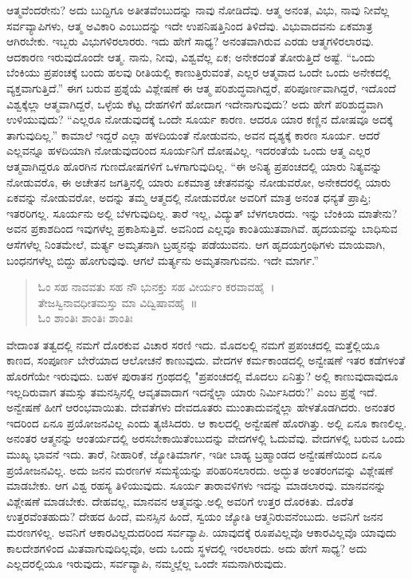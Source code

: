 ಆತ್ಮವೆಂದರೇನು? ಅದು ಬುದ್ದಿಗೂ ಅತೀತವೆಂಬುದನ್ನು ನಾವು ನೋಡಿದೆವು. ಆತ್ಮ ಅನಂತ, ವಿಭು, ನಾವು ನೀವೆಲ್ಲ ಸರ್ವವ್ಯಾಪಿಗಳು, ಆತ್ಮ ಅವಿಕಾರಿ ಎಂಬುದನ್ನು ಇದೇ ಉಪನಿಷತ್ತಿನಿಂದ ತಿಳಿದೆವು. ವಿಭುವಾದವನು ಏಕಮಾತ್ರ ಆಗಿರಬೇಕು. ಇಬ್ಬರು ವಿಭುಗಳಿರಲಾರರು. ಇದು ಹೇಗೆ ಸಾಧ್ಯ? ಅನಂತವಾಗಿರುವ ಎರಡು ಆತ್ಮಗಳಿರಲಾರವು. ಆದಕಾರಣ ಇರುವುದೊಂದೇ ಆತ್ಮ. ನಾನು, ನೀವು, ವಿಶ್ವವೆಲ್ಲ ಏಕ; ಅನೇಕದಂತೆ ತೋರುತ್ತಿದೆ ಅಷ್ಟೆ. “ಒಂದು ಬೆಂಕಿಯು ಪ್ರಪಂಚಕ್ಕೆ ಬಂದು ಹಲವು ರೀತಿಯಲ್ಲಿ ಕಾಣುತ್ತಿರುವಂತೆ, ಎಲ್ಲರ ಆತ್ಮವಾದ ಒಂದೇ ಒಂದು ಅನೇಕದಲ್ಲಿ ವ್ಯಕ್ತವಾಗುತ್ತಿದೆ.” ಈಗ ಬರುವ ಪ್ರಶ್ನೆಯೆ ವಿಶ್ಲೇಷಣೆ ಈ ಆತ್ಮ ಪರಿಶುದ್ಧವಾಗಿದ್ದರೆ, ಪರಿಪೂರ್ಣವಾಗಿದ್ದರೆ, ಇದೊಂದೆ ವಿಶ್ವಕ್ಕೆಲ್ಲಾ ಆತ್ಮವಾಗಿದ್ದರೆ, ಒಳ್ಳೆಯ ಕೆಟ್ಟ ದೇಹಗಳಿಗೆ ಹೋದಾಗ ಇದೇನಾಗುವುದು? ಅದು ಹೇಗೆ ಪರಿಶುದ್ಧವಾಗಿ ಉಳಿಯುವುದು? “ಎಲ್ಲರೂ ನೋಡುವುದಕ್ಕೆ ಒಂದೇ ಸೂರ್ಯ ಕಾರಣ. ಆದರೂ ಯಾರ ಕಣ್ಣಿನ ದೋಷವೂ ಅದಕ್ಕೆ ತಾಗುವುದಿಲ್ಲ.” ಕಾಮಾಲೆ ಇದ್ದರೆ ಎಲ್ಲಾ ಹಳದಿಯಂತೆ ನೋಡುವನು, ಅವನ ದೃಶ್ಯಕ್ಕೆ ಕಾರಣ ಸೂರ್ಯ. ಆದರೆ ಎಲ್ಲವನ್ನೂ ಹಳದಿಯಾಗಿ ನೋಡುವುದರಿಂದ ಸೂರ್ಯನಿಗೆ ದೋಷವಿಲ್ಲ. ಇದರಂತೆಯೆ ಒಂದು ಆತ್ಮ ಎಲ್ಲರ ಆತ್ಮವಾಗಿದ್ದರೂ ಹೊರಗಿನ ಗುಣದೋಷಗಳಿಗೆ ಒಳಗಾಗುವುದಿಲ್ಲ. “ಈ ಅನಿತ್ಯ ಪ್ರಪಂಚದಲ್ಲಿ ಯಾರು ನಿತ್ಯವನ್ನು ನೋಡುವರೊ, ಈ ಅಚೇತನ ಜಗತ್ತಿನಲ್ಲಿ ಯಾರು ಏಕಮಾತ್ರ ಚೇತನವನ್ನು ನೋಡುವರೋ, ಅನೇಕದರಲ್ಲಿ ಯಾರು ಏಕವನ್ನು ನೋಡುವರೋ, ಅದನ್ನು ತಮ್ಮ ಆತ್ಮದಲ್ಲಿ ನೋಡುವರೋ ಅವರಿಗೆ ಮಾತ್ರ ಅನಂತ ಧನ್ಯತೆ ಪ್ರಾಪ್ತಿ; ಇತರರಿಗಲ್ಲ. ಸೂರ್ಯನು ಅಲ್ಲಿ ಬೆಳಗುವುದಿಲ್ಲ. ತಾರೆ ಇಲ್ಲ, ವಿದ್ಯುತ್ ಬೆಳಗಲಾರದು. ಇನ್ನು ಬೆಂಕಿಯ ಮಾತೇನು? ಅವನ ಪ್ರಕಾಶದಿಂದ ಇವುಗಳೆಲ್ಲ ಪ್ರಕಾಶಿಸುತ್ತಿವೆ. ಅವನಿಂದ ಎಲ್ಲವೂ ಕಾಂತಿಯುತವಾಗಿವೆ. ಹೃದಯವನ್ನು ಬಾಧಿಸುವ ಆಸೆಗಳೆಲ್ಲ ನಿಂತಮೇಲೆ, ಮರ್ತ್ಯ ಅಮೃತನಾಗಿ ಬ್ರಹ್ಮನನ್ನು ಪಡೆಯುವನು. ಆಗ ಹೃದಯಗ್ರಂಥಿಗಳು ಮಾಯವಾಗಿ, ಬಂಧನಗಳೆಲ್ಲ ಬಿದ್ದು ಹೋಗುವುವು. ಆಗಲೆ ಮರ್ತ್ಯನು ಅಮೃತನಾಗುವನು. ಇದೇ ಮಾರ್ಗ.”

\begin{verse}
ಓಂ ಸಹ ನಾವವತು ಸಹ ನೌ ಭುನಕ್ತು ಸಹ ವೀರ್ಯಂ ಕರವಾವಹೈ~।\\ತೇಜಸ್ವಿನಾವಧೀತಮಸ್ತು ಮಾ ವಿದ್ವಿಷಾವಹೈ~॥\\ಓಂ ಶಾಂತಿಃ ಶಾಂತಿಃ ಶಾಂತಿಃ 
\end{verse}

ವೇದಾಂತ ತತ್ವದಲ್ಲಿ ನಮಗೆ ದೊರಕುವ ವಿಚಾರ ಸರಣಿ ಇದು. ಮೊದಲಲ್ಲಿ ನಮಗೆ ಪ್ರಪಂಚದಲ್ಲಿ ಮತ್ತೆಲ್ಲಿಯೂ ಕಾಣದ, ಸಂಪೂರ್ಣ ಬೇರೆಯಾದ ಆಲೋಚನೆ ಕಾಣುವುದು. ವೇದಗಳ ಕರ್ಮಕಾಂಡದಲ್ಲಿ ಅನ್ವೇಷಣೆ ಇತರ ಕಡೆಗಳಂತೆ ಹೊರಗೆಯೇ ಇರುವುದು. ಬಹಳ ಪುರಾತನ ಗ್ರಂಥದಲ್ಲಿ "ಪ್ರಪಂಚದಲ್ಲಿ ಮೊದಲು ಏನಿತ್ತು? ಅಲ್ಲಿ ಕಾಣುವುದಾವುದೂ ಇಲ್ಲದಿರುವಾಗ ತಮಸ್ಸು ತಮನಸ್ಸಿನಲ್ಲಿ ಆವೃತವಾದಾಗ ಇದನ್ನೆಲ್ಲಾ ಯಾರು ನಿರ್ಮಿಸಿದರು?' ಎಂಬ ಪ್ರಶ್ನೆ ಇದೆ. ಅನ್ವೇಷಣೆ ಹೀಗೆ ಆರಂಭವಾಯಿತು. ದೇವತೆಗಳು ದೇವದೂತರು ಮುಂತಾದುವನ್ನೆಲ್ಲಾ ಹೇಳತೊಡಗಿದರು. ಅನಂತರ ಇದರಿಂದ ಏನೂ ಪ್ರಯೋಜನವಿಲ್ಲ ಎಂದು ತ್ಯಜಿಸಿದರು. ಆ ಕಾಲದಲ್ಲಿ ಅನ್ವೇಷಣೆ ಹೊರಗಿತ್ತು. ಅಲ್ಲಿ ಏನೂ ಕಾಣಲಿಲ್ಲ. ಅನಂತರ ಆತ್ಮನನ್ನು ಆಂತರ್ಯದಲ್ಲಿ ಅರಸಬೇಕಾಯಿತೆಂಬುದನ್ನು ವೇದಗಳಲ್ಲಿ ಓದುವೆವು. ವೇದಗಳಲ್ಲಿ ಬರುವ ಒಂದು ಮುಖ್ಯ ಭಾವನೆ ಇದು. ತಾರೆ, ನೀಹಾರಿಕೆ, ಜ್ಯೋತಿಮಾರ್ಗ, ಇಡೀ ಬಾಹ್ಯ ಬ್ರಹ್ಮಾಂಡದ ಅನ್ವೇಷಣೆಯಿಂದ ಏನೂ ಪ್ರಯೋಜನವಿಲ್ಲ. ಅದು ಜನನ ಮರಣಗಳ ಸಮಸ್ಯೆಯನ್ನು ಪರಿಹರಿಸಲಾರದು. ಅದ್ಭುತ ಅಂತರಂಗವನ್ನು ವಿಶ್ಲೇಷಣೆ ಮಾಡಬೇಕು. ಆಗ ವಿಶ್ವ ರಹಸ್ಯ ತಿಳಿಯುವುದು. ಸೂರ್ಯ ತಾರಾವಳಿಗಳು ಇದನ್ನು ಮಾಡಲಾರವು. ಮಾನವನನ್ನು ವಿಶ್ಲೇಷಣೆ ಮಾಡಬೇಕು. ದೇಹವಲ್ಲ, ಮಾನವನ ಆತ್ಮವನ್ನು.ಅಲ್ಲಿ ಅವರಿಗೆ ಉತ್ತರ ದೊರಕಿತು. ದೊರೆತ ಉತ್ತರವೆಂತಹುದು? ದೇಹದ ಹಿಂದೆ, ಮನಸ್ಸಿನ ಹಿಂದೆ, ಸ್ವಯಂ ಜ್ಯೋತಿ ಆತ್ಮನಿರುವನೆಂಬುದು. ಅವನಿಗೆ ಜನನ ಮರಣಗಳಿಲ್ಲ. ಅವನಿಗೆ ಆಕಾರವಿಲ್ಲದುದರಿಂದ ಸರ್ವವ್ಯಾಪಿ. ಯಾವುದಕ್ಕೆ ರೂಪವಿಲ್ಲವೊ ಆಕಾರವಿಲ್ಲವೊ ಯಾವುದು ಕಾಲದೇಶಗಳಿಂದ ಮಿತವಾಗುವುದಿಲ್ಲವೊ, ಅದು ಒಂದು ಸ್ಥಳದಲ್ಲಿ ಇರಲಾರದು. ಅದು ಹೇಗೆ ಸಾಧ್ಯ? ಅದು ಎಲ್ಲದರಲ್ಲಿಯೂ ಇರುವುದು, ಸರ್ವವ್ಯಾಪಿ, ನಮ್ಮಲ್ಲೆಲ್ಲ ಒಂದೇ ಸಮನಾಗಿರುವುದು.

